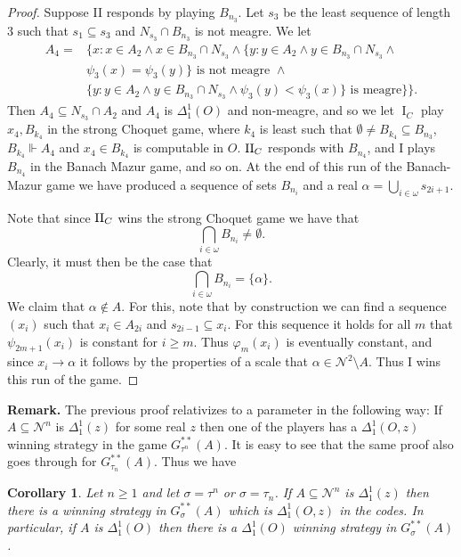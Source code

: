 \documentclass[11pt, english]{article}
\newtheorem{cor}{Corollary}
\DeclareMathOperator{\I}{I}
\newcommand{\baire}{\mathscr N}
\newcommand{\forces}{\Vdash}
\begin{document}
\begin{proof}
Suppose II responds by playing $B_{n_3}$. Let $s_3$ be the least
sequence of length 3 such that $s_1\subseteq s_3$ and $N_{s_3}\cap
B_{n_3}$ is not meagre. We let
\begin{align*}
A_4=&\{x: x\in A_2\wedge x\in B_{n_3}\cap N_{s_3}\wedge \{y: y\in A_2\wedge y\in B_{n_3}\cap N_{s_3}\wedge\\
&\psi_3(x)=\psi_3(y)\}\text{ is not meagre }\wedge\\
&\{y:y\in A_2\wedge y\in B_{n_3}\cap
N_{s_3}\wedge\psi_3(y)<\psi_3(x)\}\text{ is meagre}\}\}.
\end{align*}
Then $A_4\subseteq N_{s_3}\cap A_2$ and $A_4$ is $\Delta^1_1(O)$
and non-meagre, and so we let $\I_C$ play $x_4, B_{k_4}$ in the
strong Choquet game, where $k_4$ is least such that $\emptyset\neq
B_{k_4}\subseteq B_{n_3}$, $B_{k_4}\forces A_4$ and $x_4\in
B_{k_4}$ is computable in $O$. $\operatorname{II}_C$ responds with $B_{n_4}$,
and I plays $B_{n_4}$ in the Banach Mazur game, and so on. At the
end of this run of the Banach-Mazur game we have produced a
sequence of sets $B_{n_i}$ and a real $\alpha=\bigcup_{i\in\omega}
s_{2i+1}$.

Note that since $\operatorname{II}_C$ wins the strong Choquet game we have that
$$
\bigcap_{i\in\omega} B_{n_i}\neq\emptyset.
$$
Clearly, it must then be the case that
$$
\bigcap_{i\in\omega} B_{n_i}=\{\alpha\}.
$$
We claim that $\alpha\notin A$. For this, note that by
construction we can find a sequence $(x_i)$ such that $x_i\in
A_{2i}$ and $s_{2i-1}\subseteq x_i$. For this sequence it holds
for all $m$ that $\psi_{2m+1}(x_i)$ is constant for $i\geq m$.
Thus $\varphi_m(x_i)$ is eventually constant, and since $x_i\to
\alpha$ it follows by the properties of a scale that $\alpha\in
\baire^2\setminus A$. Thus I wins this run of the game.
\end{proof}

\noindent \textbf{Remark.} The previous proof relativizes to a parameter in the
following way: If $A\subseteq \baire^n$ is $\Delta^1_1(z)$ for
some real $z$ then one of the players has a $\Delta^1_1(O,z)$
winning strategy in the game $G^{**}_{\tau^n}(A)$. It is easy to
see that the same proof also goes through for
$G^{**}_{\tau_n}(A)$. Thus we have

\begin{cor}
Let $n\geq 1$ and let $\sigma=\tau^n$ or $\sigma=\tau_n$. If
$A\subseteq\baire^n$ is $\Delta^1_1(z)$ then there is a winning
strategy in $G^{**}_{\sigma}(A)$ which is $\Delta^1_1(O,z)$ in the
codes. In particular, if $A$ is $\Delta^1_1(O)$ then there is a
$\Delta^1_1(O)$ winning strategy in $G^{**}_\sigma(A)$.
\end{cor}
\end{document}
